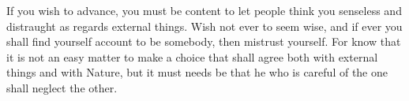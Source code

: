If you wish to  advance, you must be content to let  people think you senseless
and distraught as regards  external things. Wish not ever to  seem wise, and if
ever you  shall find yourself account  to be somebody, then  mistrust yourself.
For know that it  is not an easy matter to make a  choice that shall agree both
with external  things and  with Nature,  but it must  needs be  that he  who is
careful of the one shall neglect the other.
